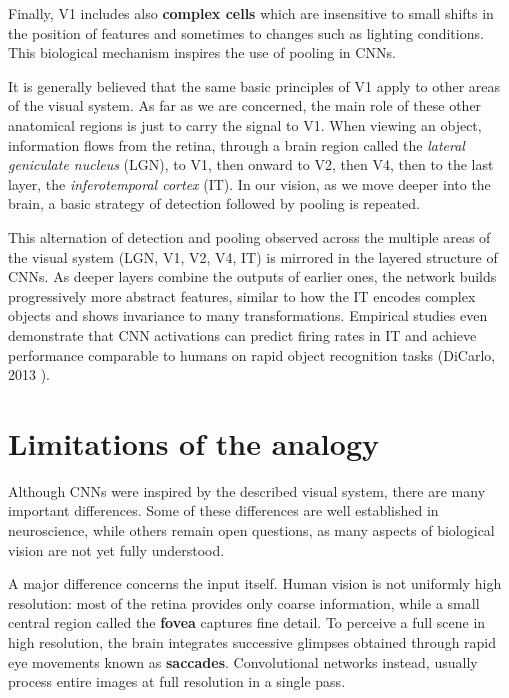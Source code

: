 Finally, V1 includes also \textbf{complex cells} which are insensitive to small shifts in the position of features and sometimes to changes such as lighting conditions. This biological mechanism inspires the use of pooling in CNNs.

\clearpage

It is generally believed that the same basic principles of V1 apply to other areas of the visual system. As far as we are concerned, the main role of these other anatomical regions is just to carry the signal to V1. When viewing an object, information ﬂows from the retina, through a brain region called the \textit{lateral geniculate nucleus } (LGN), to V1, then onward to V2, then V4, then to the last layer, the \textit{inferotemporal cortex} (IT). In our vision, as we move deeper into the brain, a basic strategy of detection followed by pooling is repeated.

This alternation of detection and pooling observed across the multiple areas of the visual system (LGN, V1, V2, V4, IT) is mirrored in the layered structure of CNNs.  
As deeper layers combine the outputs of earlier ones, the network builds progressively more abstract features, similar to how the IT encodes complex objects and shows invariance to many transformations. Empirical studies even demonstrate that CNN activations can predict firing rates in IT and achieve performance comparable to humans on rapid object recognition tasks (DiCarlo, 2013 \cite{dicarlo2013}). 

\section{Limitations of the analogy}

Although CNNs were inspired by the described visual system, there are many important differences. Some of these differences are well established in neuroscience, while others remain open questions, as many aspects of biological vision are not yet fully understood.  

A major difference concerns the input itself. Human vision is not uniformly high resolution: most of the retina provides only coarse information, while a small central region called the \textbf{fovea} captures fine detail.  
To perceive a full scene in high resolution, the brain integrates successive glimpses obtained through rapid eye movements known as \textbf{saccades}. Convolutional networks instead, usually process entire images at full resolution in a single pass. 

